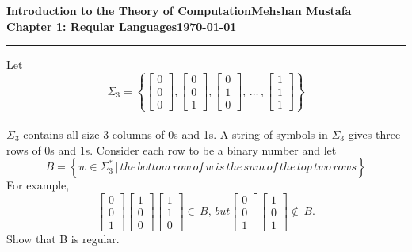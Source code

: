\documentclass[11pt]{article}
\newcommand{\myname}{Mehshan Mustafa}
\newcommand{\dated}{\today}
\newenvironment{problem}[2][Problem]{\begin{trivlist}
\item[\hskip \labelsep {\bfseries #1}\hskip \labelsep {\bfseries #2.}]}{\end{trivlist}}
\begin{document}
\textbf{Introduction to the Theory of
Computation}\hfill\textbf{\myname}\\[0.01in]
\textbf{Chapter 1: Reqular Languages}\hfill\textbf{\dated}\\
\smallskip\hrule\bigskip

\begin{problem}{1.32}
Let
\[
\Sigma_{3} = 
\left\{
\begin{bmatrix}
    0 \\
    0 \\
    0
\end{bmatrix} ,
\begin{bmatrix}
    0 \\
    0 \\
    1
\end{bmatrix} ,
\begin{bmatrix}
    0 \\
    1 \\
    0
\end{bmatrix} ,
\, \hdots \, ,
\begin{bmatrix}
    1 \\
    1 \\
    1
\end{bmatrix}
\right\}
\]
\\
$\Sigma_{3}$ contains all size 3 columns of 0s and 1s. A string of symbols in $\Sigma_{3}$ gives three rows of 0s and 1s. Consider each row to be a binary number and let
\[
B = 
\left\{
w \in \Sigma_{3}^{*} \, | \, the \, bottom \, row \, of \, w \, is \, the \, sum \, of \, the \, top \, two \, rows
\right\}
\]
For example,
\[
\begin{bmatrix}
    0 \\
    0 \\
    1
\end{bmatrix}
\begin{bmatrix}
    1 \\
    0 \\
    0
\end{bmatrix}
\begin{bmatrix}
    1 \\
    1 \\
    0
\end{bmatrix} \in \, B, \, but
\begin{bmatrix}
    0 \\
    0 \\
    1
\end{bmatrix}
\begin{bmatrix}
    1 \\
    0 \\
    1
\end{bmatrix} \not\in \, B. 
\]
Show that B is regular.
\end{problem}
\end{document}
